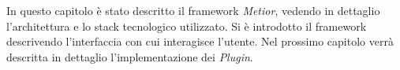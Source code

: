In questo capitolo è stato descritto il framework \emph{Metior}, vedendo in dettaglio l'architettura e lo stack tecnologico utilizzato.
Si è introdotto il framework descrivendo l'interfaccia con cui interagisce l'utente.
Nel prossimo capitolo verrà descritta in dettaglio l'implementazione dei \emph{Plugin}.
